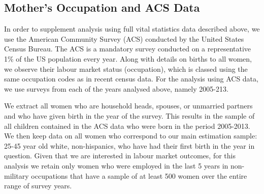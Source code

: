 \documentclass[a4paper, 12 pt]{article}
\theoremstyle{plain}
\begin{document}
\begin{doublespace}


\subsection{Mother's Occupation and ACS Data}
In order to supplement analysis using full vital statistics data described above,
we use the American Community Survey (ACS) conducted by the United States Census
Bureau.  The ACS is a mandatory survey conducted on a representative 1\% of the
US population every year.  Along with details on births to all women, we observe
their labour market status (occupation), which is classed using the same
occupation codes as in recent census data.  For the analysis using ACS data, we
use surveys from each of the years analysed above, namely 2005-213.

We extract all women who are household heads, spouses, or unmarried partners and
who have given birth in the year of the survey.  This results in the sample of
all children contained in the ACS data who were born in the period 2005-2013. We
then keep data on all women who correspond to our main estimation sample: 25-45
year old white, non-hispanics, who have had their first birth in the year in
question.  Given that we are interested in labour market outcomes, for this
analysis we retain only women who were employed in the last 5 years in non-%
military occupations that have a sample of at least 500 women over the entire
range of survey years.


\end{doublespace}
\end{document}
